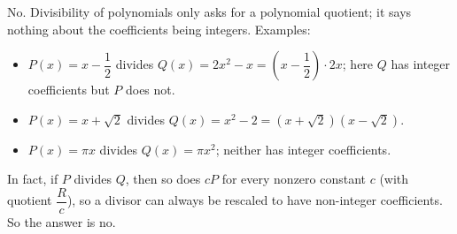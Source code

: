 No. Divisibility of polynomials only asks for a polynomial quotient; it says nothing about the coefficients being integers. Examples:
\begin{itemize}
\item $P(x)=x-\dfrac12$ divides $Q(x)=2x^2-x=\left(x-\dfrac12\right)\cdot2x$; here $Q$ has integer coefficients but $P$ does not.
\item $P(x)=x+\sqrt2$ divides $Q(x)=x^2-2=\left(x+\sqrt2\right)\left(x-\sqrt2\right)$.
\item $P(x)=\pi x$ divides $Q(x)=\pi x^2$; neither has integer coefficients.
\end{itemize}
In fact, if $P$ divides $Q$, then so does $cP$ for every nonzero constant $c$ (with quotient $\dfrac{R}{c}$), so a divisor can always be rescaled to have non-integer coefficients. So the answer is $\boxed{\text{no}}$.
